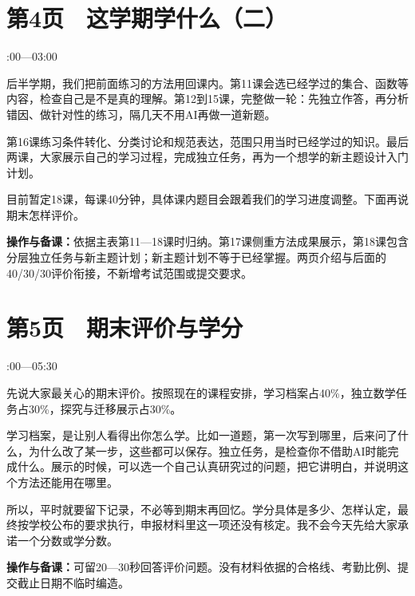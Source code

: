 \documentclass[UTF8,a4paper,11pt,fontset=fandol]{ctexart}
\newcommand{\tip}[1]{\par{\small\color{black!65}\noindent\textbf{操作与备课：}#1\par}}
\begin{document}
\par\noindent\begin{minipage}{\linewidth}

\section*{第4页　这学期学什么（二）}

{\small{}:00—03:00\par}

后半学期，我们把前面练习的方法用回课内。第11课会选已经学过的集合、函数等内容，检查自己是不是真的理解。第12到15课，完整做一轮：先独立作答，再分析错因、做针对性的练习，隔几天不用AI再做一道新题。

第16课练习条件转化、分类讨论和规范表达，范围只用当时已经学过的知识。最后两课，大家展示自己的学习过程，完成独立任务，再为一个想学的新主题设计入门计划。

目前暂定18课，每课40分钟，具体课内题目会跟着我们的学习进度调整。下面再说期末怎样评价。

\tip{依据主表第11—18课时归纳。第17课侧重方法成果展示，第18课包含分层独立任务与新主题计划；新主题计划不等于已经掌握。两页介绍与后面的40/30/30评价衔接，不新增考试范围或提交要求。}

\end{minipage}\par\vspace{2mm}

\par\noindent\begin{minipage}{\linewidth}

\section*{第5页　期末评价与学分}

{\small{}:00—05:30\par}

先说大家最关心的期末评价。按照现在的课程安排，学习档案占40\%，独立数学任务占30\%，探究与迁移展示占30\%。

学习档案，是让别人看得出你怎么学。比如一道题，第一次写到哪里，后来问了什么，为什么改了某一步，这些都可以保存。独立任务，是检查你不借助AI时能完成什么。展示的时候，可以选一个自己认真研究过的问题，把它讲明白，并说明这个方法还能用在哪里。

所以，平时就要留下记录，不必等到期末再回忆。学分具体是多少、怎样认定，最终按学校公布的要求执行，申报材料里这一项还没有核定。我不会今天先给大家承诺一个分数或学分数。

\tip{可留20—30秒回答评价问题。没有材料依据的合格线、考勤比例、提交截止日期不临时编造。}

\end{minipage}\par\vspace{2mm}
\end{document}

